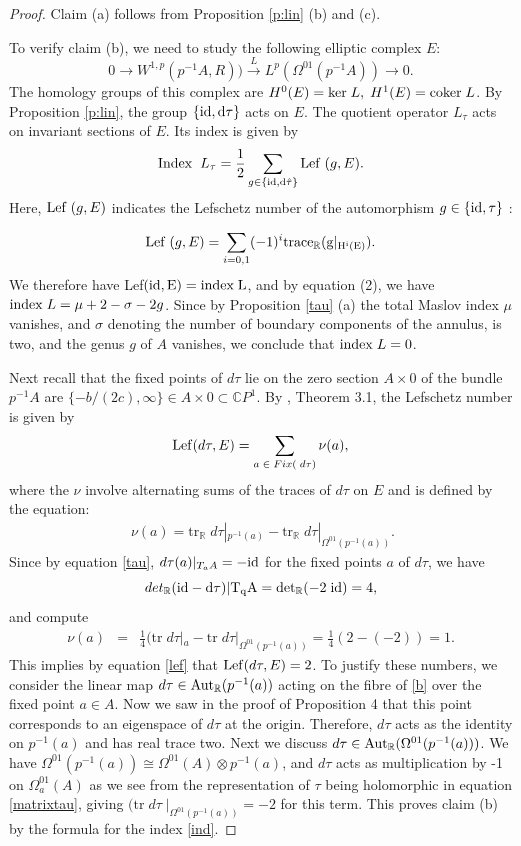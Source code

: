 \documentclass{amsart}
\newcommand{\be}{\begin{equation}}
\newcommand{\ee}{\end{equation}}
\newcommand{\bean}{\begin{eqnarray*}}
\newcommand{\eean}{\end{eqnarray*}}
\begin{document}
\begin{proof}
 Claim (a) follows from Proposition \ref{p:lin} (b) and (c). 
    
To verify claim (b), we need to study the following elliptic complex $E$:
\[
0 \longrightarrow W^{1,p}(p^{-1}A,R))  \stackrel{L}\longrightarrow  
L^p(\Omega^{01}(p^{-1}A))  \longrightarrow 0.
\]
The homology groups of this complex are $H^0(E)= {\rm ker}\;L,\; H^1(E)= {\rm coker}\;L$.
By Proposition \ref{p:lin}, the group $\{\rm{id}, d \tau\}$ acts on  $E$. The quotient operator $L_\tau$ acts on invariant sections of $E$. Its index is given by 
\be \label{ind}
{\rm Index}\;\; L_\tau=\frac{1}{2}\sum_{g\in\{\rm{id}, d\hat{\tau}\}}{\rm Lef}\;(g,E).
\ee
Here,  ${\rm Lef}\;(g,E)$ indicates the Lefschetz number of the automorphism 
$g \in \{\rm{id},\tau\}$ : 

\[ {\rm Lef}\;(g,E)=
 \sum_{i=0,1}  (-1)^{i} {\rm trace_{{\mathbb{R}}} (g|_{H^i(E)})}.
\] 
 We therefore have Lef$(\rm{id}, E)=\mbox{index}\; L $, and by \cite{HLS} equation (2), we have ${\rm index}\; L=\mu + 2- \sigma -2g $. Since by Proposition \ref{tau} (a) the total Maslov index $ \mu$ vanishes, and $ \sigma $ denoting the number of  boundary components of the annulus, is two, and the genus $g$ of $A$ vanishes, we conclude that $ {\rm index}\; L=0$. 

Next recall that the fixed points of $ d \tau$ lie on the zero section   $A \times 0$  of the bundle $p^{-1}A $ are $\{-b/(2c),\infty\} \in A \times 0 \subset \mathbb{C}P^1$. By \cite{AS}, Theorem 3.1, 
the Lefschetz number is given by 
\be \label{lef}
{\rm Lef}(d \tau,E)=\sum_{a\; \in \;Fix(\;d\tau)}{\nu (a)},
\ee
where the $\nu$ involve alternating sums of the traces of $d\tau$ on $E$ and is defined by the equation:
\bean
[det_{\mathbb{R}} (\rm{id}-d\tau)|_{T_p A}] \;\nu(a)=
\mbox{tr}_{\mathbb{R}} \;d \tau |_{p^{-1} (a)} 
- \mbox{tr}_{\mathbb{R}}\; d\tau |_{\Omega^{01}( p^{-1}(a))}.
\eean
Since by equation \eqref{tau}, $d\tau (a) |_{T_a A} =-\rm{id}$ for the fixed points $a$ of $d\tau$, we have 
\[
det_{\mathbb{R}}(\rm{id}-d\tau)|T_q A=det_{\mathbb{R}} (-2\; \rm{id})=4,
\]
and compute
\bean
 \nu(a) &=& {\textstyle{\frac{1}{4}}}(\mbox{tr}\; 
d\tau|_{a}-
\mbox{tr} \;d\tau|_{\Omega^{01}(p^{-1}(a))}={\textstyle{\frac{1}{4}}}(2-(-2))=1. 
\eean
This implies by equation \eqref{lef} that $ {\rm Lef}(d \tau,E)=2 $. To justify these numbers, we consider the linear map $d\tau \in {\rm Aut}_{{\mathbb{R}}}(p^{-1}(a))$ acting on the fibre of \eqref{b} over the fixed point $a \in A$. Now we saw in the proof of Proposition 4 that this point corresponds to an eigenspace of $d\tau $ at the origin. Therefore, $d\tau$ acts as the identity on $p^{-1}(a) $ and has real trace two. 
Next we discuss $d\tau \in{\rm Aut}_{{\mathbb{R}}}(\Omega^{01}(p^{-1}(a)))$. We have $\Omega^{01}(p^{-1}(a))\cong\Omega^{01}(A) \otimes p^{-1}(a)$, and $d\tau$ acts as multiplication by -1 on $\Omega_{a}^{01}(A)$ as we see from the representation of $\tau$ being holomorphic in equation \eqref{matrixtau}, giving $(\mbox{tr}\;d\tau\; |_{\Omega^{01}(p^{-1}(a))}=-2$ for this term. This proves claim (b) by the formula for the index \eqref{ind}.


\end{proof}
\end{document}
